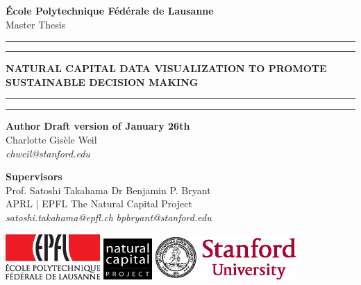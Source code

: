 
\begin{titlingpage}
\begin{center}
\Large
\textbf{École Polytechnique Fédérale de Lausanne} \\
\vspace{1cm}
Master Thesis
\vspace{2cm}
\hrule
\vspace{0.1cm}
\hrule
\vspace{1cm}
\Huge
\textbf{NATURAL CAPITAL DATA VISUALIZATION TO PROMOTE SUSTAINABLE DECISION MAKING} \\

\Large
\vspace{0.2cm}

\vspace{1cm}
\hrule
\vspace{0.1cm}
\hrule

\end{center}
\vfill
\noindent \textbf{Author} \hfill \textbf{Draft version of January 26th} \\
Charlotte Gisèle Weil \\
\textit{chweil@stanford.edu} \\
\vspace{0.5cm}

\noindent \textbf{Supervisors} \\
Prof. Satoshi Takahama          \hfill    Dr Benjamin P. Bryant \\
APRL | EPFL      \hfill    The Natural Capital Project\\
\textit{satoshi.takahama@epfl.ch} \hfill    \textit{bpbryant@stanford.edu} \\
\vspace{0.8cm}

\noindent

\includegraphics[width=0.27\textwidth]{images/epfl-logo.eps}
\hfill  \hfill \includegraphics[width=0.14\textwidth]{images/natcap-logo.eps} \hfill  \hfill 
\includegraphics[width=0.4\textwidth]{images/stanford-logo.eps}

\end{titlingpage}

